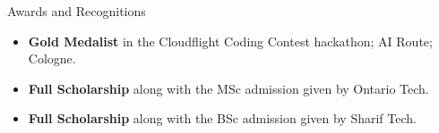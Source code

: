 	\begin{cvsection}{Awards and Recognitions}
		\begin{cvsubsection}{}{}{}	
			\begin{itemize}
				\item \textbf{Gold Medalist} in the Cloudflight Coding Contest hackathon; AI Route; Cologne.
				\item \textbf{Full Scholarship} along with the MSc admission given by Ontario Tech.
				\item \textbf{Full Scholarship} along with the BSc admission given by Sharif Tech.
			\end{itemize}
		\end{cvsubsection}
	\end{cvsection}